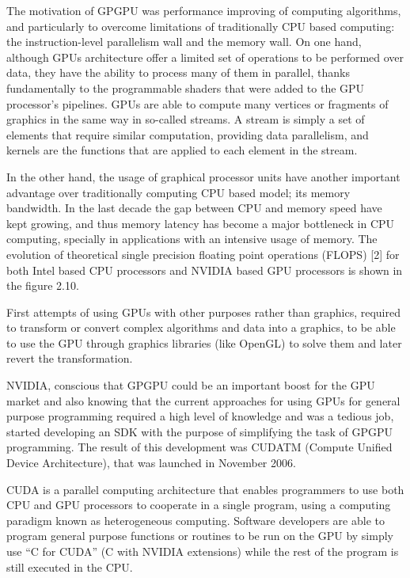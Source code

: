 \documentclass[thesis=M,english]{FITthesis}[2011/07/15]
\begin{document}
The motivation of GPGPU was performance improving of computing algorithms, and particularly to overcome limitations of traditionally CPU based computing: the instruction-level parallelism wall and the memory wall. On one hand, although GPUs architecture offer a limited set of operations to be performed over data, they have the ability to process many of them in parallel, thanks fundamentally to the programmable shaders that were added to the GPU processor’s pipelines. GPUs are able to compute many vertices or fragments of graphics in the same way in so-called streams. A stream is simply a set of elements that require similar computation, providing data parallelism, and kernels are the functions that are applied to each element in the stream.

In the other hand, the usage of graphical processor units have another important advantage over traditionally computing CPU based model; its memory bandwidth. In the last decade the gap between CPU and memory speed have kept growing, and thus memory latency has become a major bottleneck in CPU computing, specially in applications with an intensive usage of memory. The evolution of theoretical single precision floating point operations (FLOPS) [2] for both Intel based CPU processors and NVIDIA based GPU processors is shown in the figure 2.10. 

First attempts of using GPUs with other purposes rather than graphics, required to transform or convert complex algorithms and data into a graphics, to be able to use the GPU through graphics libraries (like OpenGL) to solve them and later revert the transformation. 

NVIDIA, conscious that GPGPU could be an important boost for the GPU market and also knowing that the current approaches for using GPUs for general purpose programming required a high level of knowledge and was a tedious job, started developing an SDK with the purpose of simplifying the task of GPGPU programming. The result of this development was CUDATM (Compute Unified Device Architecture), that was launched in November 2006. 

CUDA is a parallel computing architecture that enables programmers to use both CPU and GPU processors to cooperate in a single program, using a computing paradigm known as heterogeneous computing. Software developers are able to program general purpose functions or routines to be run on the GPU by simply use “C for CUDA” (C with NVIDIA extensions) while the rest of the program is still executed in the CPU. 
\end{document}
